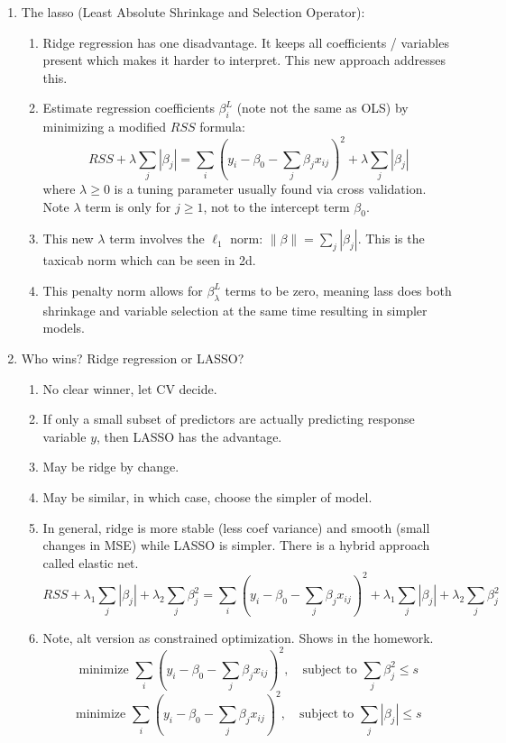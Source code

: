 \documentclass{article}
\begin{document}
\begin{enumerate}
\item The lasso (Least Absolute Shrinkage and Selection Operator):
\begin{enumerate}
\item Ridge regression has one disadvantage. It keeps all coefficients / variables present which makes it harder to interpret. This new approach addresses this.

\item Estimate regression coefficients $\beta^L_i$ (note not the same as OLS) by minimizing a modified $RSS$ formula:
\[
RSS + \lambda \sum_j |\beta_j|
= \sum_i \left( y_i - \beta_0 - \sum_j \beta_j x_{ij} \right)^2  + \lambda \sum_j |\beta_j|
\]
where $\lambda \geq 0$ is a tuning parameter usually found via cross validation. Note $\lambda$ term is only for $j \geq 1$, not to the intercept term $\beta_0$. 
\item This new $\lambda$ term involves the $\ell_1$ norm: $\| \beta\| = \sum_j |\beta_j|$. This is the taxicab norm which can be seen in 2d.
\item This penalty norm allows for $\beta^L_{\lambda}$ terms to be zero, meaning lass does both shrinkage and variable selection at the same time resulting in simpler models.

\end{enumerate}

\item Who wins? Ridge regression or LASSO?
\begin{enumerate}
\item No clear winner, let CV decide. 
\item If only a small subset of predictors are actually predicting response variable $y$, then LASSO has the advantage.
\item May be ridge by change.
\item May be similar, in which case, choose the simpler of model.
\item In general, ridge is more stable (less coef variance) and smooth (small changes in MSE) while LASSO is simpler. There is a hybrid approach called elastic net.
\[
RSS + \lambda_1 \sum_j |\beta_j| + \lambda_2 \sum_j \beta_j^2
= \sum_i \left( y_i - \beta_0 - \sum_j \beta_j x_{ij} \right)^2  + \lambda_1 \sum_j |\beta_j| + \lambda_2 \sum_j \beta_j^2
\]
\item Note, alt version as constrained optimization. Shows in the homework.
\[
\text{minimize } \sum_i \left( y_i - \beta_0 - \sum_j \beta_j x_{ij} \right)^2, \quad \text{subject to } \sum_j \beta_j^2 \leq s
\]
\[
\text{minimize } \sum_i \left( y_i - \beta_0 - \sum_j \beta_j x_{ij} \right)^2, \quad \text{subject to } \sum_j |\beta_j| \leq s
\]
\end{enumerate}
\end{enumerate}
\end{document}
